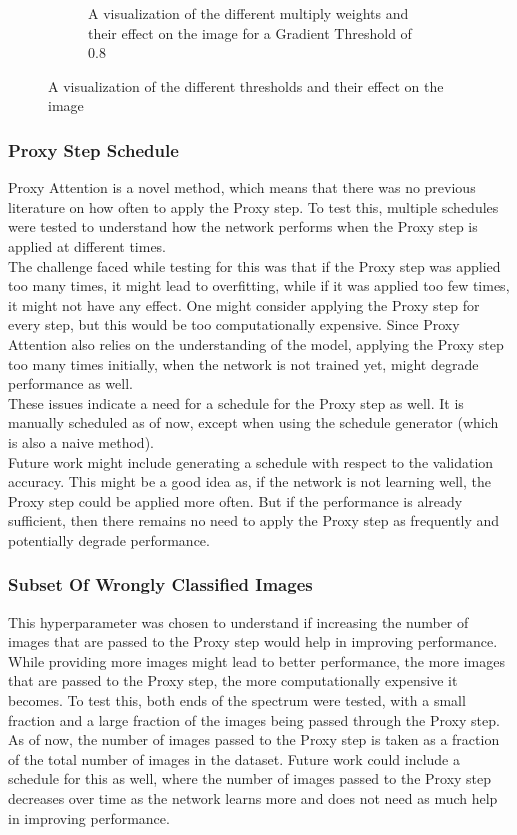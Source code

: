 \documentclass[a4paper,11pt,openright]{book}
\begin{document}
\begin{figure}[!htb]
\begin{subfigure}[b]{0.5\textwidth}
        \caption{A visualization of the different multiply weights and their effect on the image for a Gradient Threshold of 0.8}
        \label{fig:mults}
    \end{subfigure}
    \caption{A visualization of the different thresholds and their effect on the image}
    \label{fig:thresholds_and_mults}
\end{figure}

\subsubsection{Proxy Step Schedule}
Proxy Attention is a novel method, which means that there was no previous literature on how often to apply the Proxy step. To test this, multiple schedules were tested to understand how the network performs when the Proxy step is applied at different times.\\
The challenge faced while testing for this was that if the Proxy step was applied too many times, it might lead to overfitting, while if it was applied too few times, it might not have any effect. One might consider applying the Proxy step for every step, but this would be too computationally expensive. Since Proxy Attention also relies on the understanding of the model, applying the Proxy step too many times initially, when the network is not trained yet, might degrade performance as well.\\
These issues indicate a need for a schedule for the Proxy step as well. It is manually scheduled as of now, except when using the schedule generator (which is also a naive method).\\
Future work might include generating a schedule with respect to the validation accuracy. This might be a good idea as, if the network is not learning well, the Proxy step could be applied more often. But if the performance is already sufficient, then there remains no need to apply the Proxy step as frequently and potentially degrade performance.


\subsubsection{Subset Of Wrongly Classified Images}
This hyperparameter was chosen to understand if increasing the number of images that are passed to the Proxy step would help in improving performance. While providing more images might lead to better performance, the more images that are passed to the Proxy step, the more computationally expensive it becomes. To test this, both ends of the spectrum were tested, with a small fraction and a large fraction of the images being passed through the Proxy step.\\
As of now, the number of images passed to the Proxy step is taken as a fraction of the total number of images in the dataset. Future work could include a schedule for this as well, where the number of images passed to the Proxy step decreases over time as the network learns more and does not need as much help in improving performance.
\end{document}
